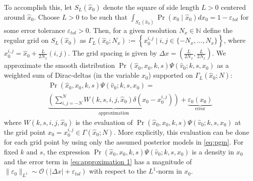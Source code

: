 \documentclass[letterpaper,10pt,conference]{ieeetran}
\begin{document}
 To accomplish this, let $S_L(\hat{x}_0)$ denote the square of side length $L>0$ centered around $\hat{x}_0$.
 Choose  $L>0$ to be such that $\int_{S_L(\hat{x}_0)} \Pr( x_0 \mid \hat{x}_0) dx_0 = 1 - \varepsilon_{tol}$ for some error tolerance $\varepsilon_{tol}>0$.
 Then, for a given resolution $N_x \in \mathbb{N}$ define the regular grid on $S_L(\hat{x}_0)$ as $\Gamma_L( \hat{x}_0 ; N_x ) := \left\{ x_0^{i,j} \mid i,j \in \{ -N_x,\dots,N_x \} \right\}$, where $x_0^{i,j} = \hat{x}_0 + \frac{L}{2N_x}(i,j)$.
 The grid spacing is given by $\Delta x = ( \frac{L}{2N_x}, \frac{L}{2N_x} )$.
We approximate the smooth distribution $\Pr(\hat{x}_0, x_0, k, s) \Psi( \hat{v}_0 ; k, s, x_0 )$ as a weighted sum of Dirac-deltas (in the variable $x_0$) supported on $\Gamma_L( \hat{x}_0;N)$:
\begin{align}
		&\Pr(\hat{x}_0, x_0, k, s) \Psi( \hat{v}_0 ; k, s, x_0 ) = \nonumber \\
		& \underbrace{\left( \sum_{i,j=-N}^{N} W(k,s,i,j,\hat{x}_0) \delta( x_0 - x_0^{i,j} ) \right)}_{\text{approximation}}
		+ \underbrace{ \varepsilon_0(x_0) }_{\text{error}}
	\label{eq:approximation 1}
\end{align}
where $W(k,s,i,j,\hat{x}_0)$ is the evaluation of $\Pr(\hat{x}_0, x_0, k, s) \Psi( \hat{v}_0 ; k, s, x_0 )$ at the grid point $x_0 = x_0^{i,j} \in \Gamma( \hat{x}_0; N)$.
More explicitly, this evaluation can be done for each grid point by using only the assumed posterior models in \eqref{eq:pgm}.
For fixed $k$ and $s$, the expression $\Pr(\hat{x}_0, x_0, k, s) \Psi( \hat{v}_0 ; k, s, x_0 )$ is a density in $x_0$ and the error term in \eqref{eq:approximation 1} has a magnitude of $\| \varepsilon_0 \|_{L^1} \sim \mathcal{O}( | \Delta x |  + \varepsilon_{tol} )$ with respect to the $L^1$-norm in $x_0$.
\end{document}
